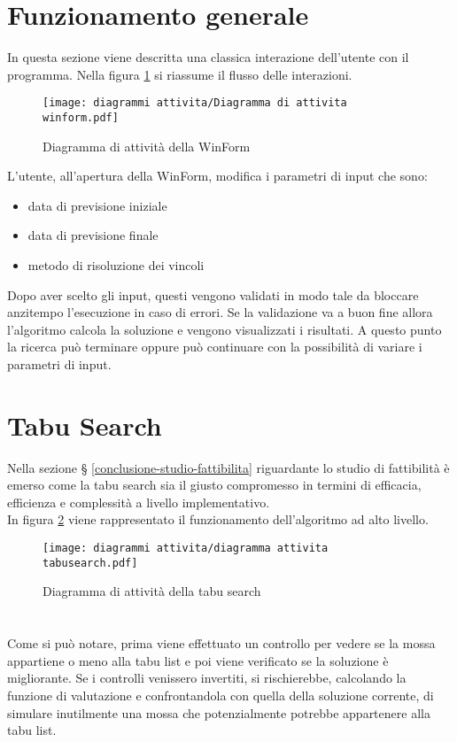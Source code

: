 \section{Funzionamento generale}
In questa sezione viene descritta una classica interazione dell'utente con il programma.
Nella figura \ref{diagramma-attivita-winform} si riassume il flusso delle interazioni.

\begin{figure}[!h] 
    \centering 
    \texttt{[image: diagrammi attivita/Diagramma di attivita winform.pdf]} 
    \caption{Diagramma di attività della WinForm}
    \label{diagramma-attivita-winform}
\end{figure}

\noindent L'utente, all'apertura della WinForm, modifica i parametri di input che sono:
\begin{itemize}
    \item data di previsione iniziale
    \item data di previsione finale
    \item metodo di risoluzione dei vincoli
\end{itemize}
\noindent Dopo aver scelto gli input, questi vengono validati in modo tale da bloccare anzitempo
l'esecuzione in caso di errori.
Se la validazione va a buon fine allora l'algoritmo calcola la soluzione e vengono visualizzati i risultati.
A questo punto la ricerca può terminare oppure può continuare con la possibilità di variare i parametri di input.

\section{Tabu Search}
\label{sec:tabu-search}
\noindent Nella sezione § \ref{conclusione-studio-fattibilita}
riguardante lo studio di fattibilità è emerso come la tabu search
sia il giusto compromesso in termini di efficacia, efficienza
e complessità a livello implementativo.\\
In figura \ref{diagramma-attivita-tabu-search}
viene rappresentato il funzionamento dell'algoritmo ad alto livello.
\vspace*{\fill}
\begin{figure}[!h] 
    \centering 
    \texttt{[image: diagrammi attivita/diagramma attivita tabusearch.pdf]} 
    \caption{Diagramma di attività della tabu search}
    \label{diagramma-attivita-tabu-search}
\end{figure}
\noindent \paragraph{}\hfill\\
Come si può notare, prima viene effettuato un controllo per vedere se la mossa
appartiene o meno alla tabu list e poi viene verificato se la soluzione è migliorante.
Se i controlli venissero invertiti, si rischierebbe, calcolando
la funzione di valutazione e confrontandola con quella della soluzione corrente,
di simulare inutilmente una mossa che potenzialmente potrebbe appartenere alla tabu list.
\vspace*{\fill}

